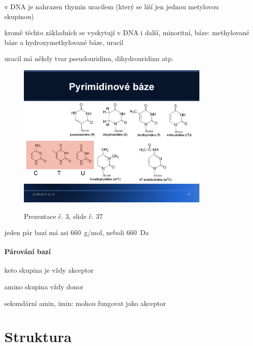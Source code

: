 \documentclass[DIV=8]{scrreprt}
\begin{document}
\begin{myItemize}[nosep]
    \item v DNA je nahrazen thymin uracilem (který se liší jen jednou metylovou skupinou)
    \item kromě těchto základních se vyskytují v DNA i další, minoritní, báze: methylované báze a hydroxymethylované báze, uracil
    \item uracil má někdy tvar pseudouridinu, dihydrouridinu atp. \begin{figure}
    \caption{Prezentace č. 3, slide č. 37}
    \includegraphics[width=0.85\textwidth]{slides-3/slide-37.jpg}
    \centering
    \label{slides-3-slide-37}
\end{figure}

    \item jeden pár bazí má asi \si{660 g/mol}, neboli \si{660 Da}
\end{myItemize}



\paragraph{Párování bazí}
\begin{myItemize}[nosep]
    \item keto skupina je vždy akceptor
    \item amino skupina vždy donor
    \item sekundární amin, imin: mohou fungovat jako akceptor
\end{myItemize}



\section{Struktura} \label{Struktura} \FloatBarrier
\end{document}
